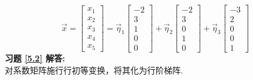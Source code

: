 \begin{equation*}
\vec{x}=\begin{bmatrix}x_1\\x_2\\x_3\\x_4\\x_5\end{bmatrix}=
\vec{\eta}_1\begin{bmatrix}-2\\3\\1\\0\\0\end{bmatrix}+\vec{\eta}_2\begin{bmatrix}-2\\3\\0\\1\\0\end{bmatrix}
+\vec{\eta}_3\begin{bmatrix}-3\\2\\0\\0\\1\end{bmatrix}
\end{equation*}
\textbf{习题 \ref{5.2} 解答:}\\
对系数矩阵施行行初等变换，将其化为行阶梯阵.
